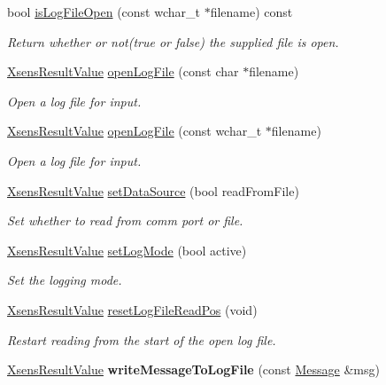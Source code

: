 \begin{DoxyCompactItemize}
bool \hyperlink{classxsens_1_1Cmt3_aa23d1cf316ae26ee48706b0a9b008a85}{is\-Log\-File\-Open} (const wchar\-\_\-t $\ast$filename) const 
\begin{DoxyCompactList}\small\item\em \-Return whether or not(true or false) the supplied file is open. \end{DoxyCompactList}\item 
\hyperlink{group__enums_ga822a2260a20af524029eef9e9a51ff6f}{\-Xsens\-Result\-Value} \hyperlink{classxsens_1_1Cmt3_a6dbfcb79ea4a056de4ba4d314e2b5521}{open\-Log\-File} (const char $\ast$filename)
\begin{DoxyCompactList}\small\item\em \-Open a log file for input. \end{DoxyCompactList}\item 
\hyperlink{group__enums_ga822a2260a20af524029eef9e9a51ff6f}{\-Xsens\-Result\-Value} \hyperlink{classxsens_1_1Cmt3_a4e34f222e47effaedcb4ef872836e462}{open\-Log\-File} (const wchar\-\_\-t $\ast$filename)
\begin{DoxyCompactList}\small\item\em \-Open a log file for input. \end{DoxyCompactList}\item 
\hyperlink{group__enums_ga822a2260a20af524029eef9e9a51ff6f}{\-Xsens\-Result\-Value} \hyperlink{classxsens_1_1Cmt3_ad9a4ec534b89573b271e54d6d3e5121d}{set\-Data\-Source} (bool read\-From\-File)
\begin{DoxyCompactList}\small\item\em \-Set whether to read from comm port or file. \end{DoxyCompactList}\item 
\hyperlink{group__enums_ga822a2260a20af524029eef9e9a51ff6f}{\-Xsens\-Result\-Value} \hyperlink{classxsens_1_1Cmt3_a283eb8c16cac78bff3a47152a72a8644}{set\-Log\-Mode} (bool active)
\begin{DoxyCompactList}\small\item\em \-Set the logging mode. \end{DoxyCompactList}\item 
\hyperlink{group__enums_ga822a2260a20af524029eef9e9a51ff6f}{\-Xsens\-Result\-Value} \hyperlink{classxsens_1_1Cmt3_a73936206e7c3d0d113d4f37a35b28699}{reset\-Log\-File\-Read\-Pos} (void)
\begin{DoxyCompactList}\small\item\em \-Restart reading from the start of the open log file. \end{DoxyCompactList}\item 
\hypertarget{classxsens_1_1Cmt3_a03454b11651918c2bee3e88b2ea601a2}{\hyperlink{group__enums_ga822a2260a20af524029eef9e9a51ff6f}{\-Xsens\-Result\-Value} {\bfseries write\-Message\-To\-Log\-File} (const \hyperlink{classxsens_1_1Message}{\-Message} \&msg)}\label{classxsens_1_1Cmt3_a03454b11651918c2bee3e88b2ea601a2}


\end{DoxyCompactItemize}
